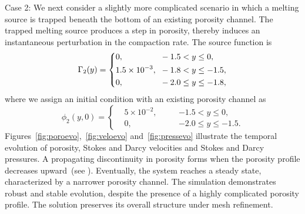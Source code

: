 Case 2: We next consider a slightly more complicated scenario in which a melting source 
is trapped beneath the bottom of an existing porosity channel. The trapped melting
source produces a step in porosity, thereby induces an instantaneous perturbation
in the compaction rate. The source function is
\begin{equation}
\Gamma_2(y) = \left \{ 
		  \begin{alignedat}{2}
					 &0, \hspace{1.13cm} &&-1.5 < y\leq 0,\\
					 &1.5\times10^{-3},\hspace{0.2cm} &&-1.8 < y\leq -1.5,\\
					 &0, \hspace{1.13cm}   &&-2.0 \leq y\leq -1.8,
\end{alignedat}
		  \right.
		  \label{eq:trapped}
\end{equation}
where we assign an initial condition with an existing porosity channel as
\begin{equation}
\phi_2(y,0) = \left \{ 
		  \begin{alignedat}{2}
					 &5\times10^{-2}, \quad &&-1.5 < y\leq 0,\\
					 &0, \quad   &&-2.0 \leq y\leq -1.5.
\end{alignedat}
		  \right.
\end{equation}
Figures~\ref{fig:poroevo},~\ref{fig:veloevo} and~\ref{fig:pressevo} 
illustrate the temporal evolution of porosity, Stokes and Darcy velocities and 
Stokes and Darcy pressures. A propagating discontinuity in porosity  
forms when the porosity profile decreases upward~(see \cite{DynamicsPartiallyMoltenRock}). Eventually, the system 
reaches a steady state, characterized by a narrower porosity channel. 
The simulation demonstrates robust and stable evolution, despite the presence of a
highly complicated porosity profile. The solution preserves its overall structure under mesh refinement.

